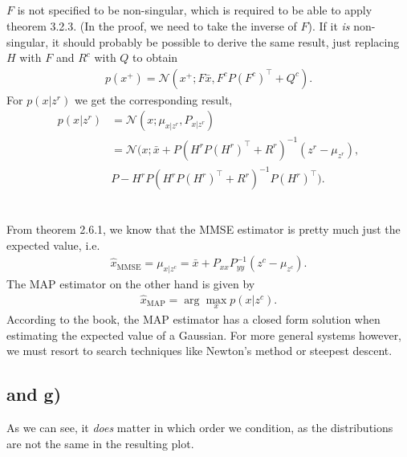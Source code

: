 \documentclass[]{article}
\begin{document}
\subsection{}
$F$ is not specified to be non-singular, which is required to be able to apply theorem 3.2.3. (In the proof, we need to take the inverse of $F$). If it \textit{is} non-singular, it should probably be possible to derive the same result, just replacing $H$ with $F$ and $R^c$ with $Q$ to obtain
\begin{equation}\begin{aligned}
p(x^+) = \mathcal{N}(x^+;F \bar x, F^cP(F^c)^\top + Q^c).
\end{aligned}\end{equation}
For $p(x|z^r)$ we get the corresponding result,
\begin{equation}\begin{aligned}
p(x|z^r) &= \mathcal{N}(x; \mu_{x|z^r}, P_{x|z^r}) \\
&= \mathcal{N}(x; \bar x + P(H^rP(H^r)^\top + R^r)^{-1}(z^r - \mu_{z^r}), \\
& P - H^rP(H^rP(H^r)^\top + R^r)^{-1}P(H^r)^\top). \\
\end{aligned}\end{equation}

\subsection{}
From theorem 2.6.1, we know that the MMSE estimator is pretty much just the expected value, i.e.
\begin{equation}\begin{aligned}
\hat x_{\text{MMSE}} = \mu_{x|z^c} =\bar x + P_{xx}P_{yy}^{-1}(z^c - \mu_{z^c}).
\end{aligned}\end{equation}
The MAP estimator on the other hand is given by
\begin{equation}\begin{aligned}
\hat x_{\text{MAP}} = \arg \max_x p(x|z^c).
\end{aligned}\end{equation}
According to the book, the MAP estimator has a closed form solution when estimating the expected value of a Gaussian. For more general systems however, we must resort to search techniques like Newton's method or steepest descent.

\subsection{ and \quad g)}

As we can see, it \textit{does} matter in which order we condition, as the distributions are not the same in the resulting plot.
\end{document}
